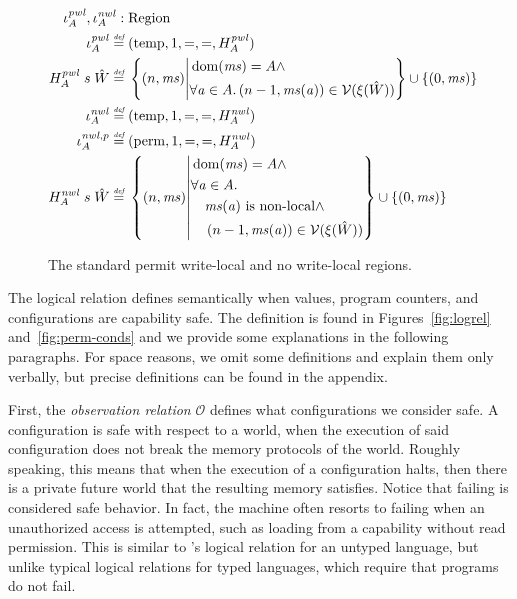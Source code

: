 \documentclass[format=acmsmall, review=true, screen=true]{acmart}
\renewcommand{\figurename}{Figure}
\newcommand{\defeq}{\stackrel{\textit{\tiny{def}}}{=}}
\newcommand{\union}{\mathbin{\cup}}
\DeclareMathOperator{\dom}{dom}
\newcommand\dominique[1]{{\color{purple} \sf \footnotesize {DD: #1}}\\}
\renewcommand\dominique[1]{}
\newcommand{\var}[1]{\mathit{#1}}
\newcommand{\hs}{\var{ms}}
\newcommand{\ms}{\hs}
\newcommand{\addr}{\var{a}}
\newcommand{\nwl}{\var{nwl}}
\newcommand{\pwl}{\var{pwl}}
\newcommand{\asmType}{\plaindom{AsmType}}
\newcommand{\plaindom}[1]{\mathrm{#1}}
\newcommand{\Regions}{\plaindom{Region}}
\newcommand{\intr}[2]{\mathcal{#1}}
\newcommand{\valueintr}[1]{\intr{V}{#1}}
\newcommand{\stdvr}{\valueintr{\asmType}}
\newcommand{\observations}{\mathcal{O}}
\newcommand{\npair}[2][n]{\left(#1,#2 \right)}
\newcommand{\plainview}[1]{\mathrm{#1}}
\newcommand{\perma}{\plainview{perm}}
\newcommand{\temp}{\plainview{temp}}
\newcommand{\nonlocal}[1]{\ensuremath{#1} \text{ is non-local}}
\begin{document}
{\begin{figure}[htb]
\begin{align*}
  \iota^\pwl_A, \iota^\nwl_A :{} & \Regions \\
  \iota^\pwl_A \defeq{} & (\temp,1,=,=,H^\pwl_A) \\
  H^\pwl_A \; s \; \hat{W} \defeq{} & \left\{\npair{\hs} \middle|
    \begin{aligned}
      &\dom(\hs) = A \land \\
      &\forall \addr \in A \ldotp \npair[n-1]{\hs(\addr)} \in \stdvr(\xi(\hat{W}))
    \end{aligned}
        \right\} \union \{\npair[0]{\ms} \} \\
  \iota^\nwl_A \defeq{} & (\temp,1,=,=,H^\nwl_A) \\
  \iota^{\nwl,p}_A \defeq{} & (\perma,1,=,=,H^\nwl_A)\\
  H^\nwl_A \; s \;\hat{W} \defeq{} & \left\{\npair{\hs} \middle|
    \begin{aligned}
      &\dom(\hs) = A \land \\
      &\forall \addr \in A \ldotp \\
      &\quad \nonlocal{\ms(\addr)} \land\\ 
      &\quad \npair[n-1]{\hs(\addr)} \in \stdvr(\xi(\hat{W}))
    \end{aligned}
        \right\} \union \{\npair[0]{\ms} \}
\end{align*}

  \caption{The standard permit write-local and no write-local regions.}
  \label{fig:std-reg}
\end{figure}
}


The logical relation defines semantically when values, program
counters, and configurations are capability safe. The definition is
found in \figurename{}s~\ref{fig:logrel} and~\ref{fig:perm-conds} and
we provide some explanations in the following paragraphs. For space
reasons, we omit some definitions and explain them only verbally, but
precise definitions can be found in the appendix.

First, the \emph{observation relation} $\observations$ defines what
configurations we consider safe. A configuration is safe
with respect to a world, when the execution of said configuration does not break
the memory protocols of the world. Roughly speaking, this means that when the
execution of a configuration halts, then there is a private future world that
the resulting memory satisfies. Notice that failing is considered safe behavior.
In fact, the machine often resorts to failing when an unauthorized access is
attempted, such as loading from a capability without read permission. This is
similar to \citet{Devriese:2016ObjCap}'s logical relation for an untyped
language, but unlike typical logical relations for typed languages, which
require that programs do not fail.
\end{document}
